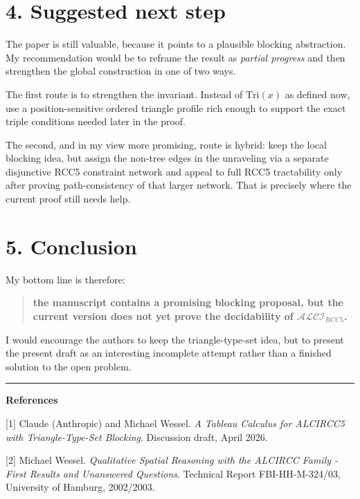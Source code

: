 \documentclass[11pt]{article}
\newcommand{\Tri}{\mathrm{Tri}}
\begin{document}
\section*{4. Suggested next step}

The paper is still valuable, because it points to a plausible blocking abstraction. My recommendation would be to reframe the result as \emph{partial progress} and then strengthen the global construction in one of two ways.

The first route is to strengthen the invariant. Instead of \(\Tri(x)\) as defined now, use a position-sensitive ordered triangle profile rich enough to support the exact triple conditions needed later in the proof.

The second, and in my view more promising, route is hybrid: keep the local blocking idea, but assign the non-tree edges in the unraveling via a separate disjunctive RCC5 constraint network and appeal to full RCC5 tractability only after proving path-consistency of that larger network. That is precisely where the current proof still needs help.

\section*{5. Conclusion}

My bottom line is therefore:
\begin{quote}
\textbf{the manuscript contains a promising blocking proposal, but the current version does not yet prove the decidability of \(\mathcal{ALCI}_{RCC5}\).}
\end{quote}

I would encourage the authors to keep the triangle-type-set idea, but to present the present draft as an interesting incomplete attempt rather than a finished solution to the open problem.

\vspace{1em}
\textcolor{Rule}{\rule{\linewidth}{0.8pt}}

\small
\textbf{References}

[1] Claude (Anthropic) and Michael Wessel. \emph{A Tableau Calculus for ALCIRCC5 with Triangle-Type-Set Blocking}. Discussion draft, April 2026.

[2] Michael Wessel. \emph{Qualitative Spatial Reasoning with the ALCIRCC Family - First Results and Unanswered Questions}. Technical Report FBI-HH-M-324/03, University of Hamburg, 2002/2003.
\end{document}
